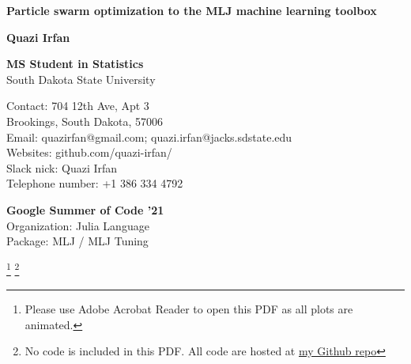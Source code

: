 \begin{titlepage}
    \begin{center}
        \vspace*{1cm}
        
        \Large
        \textbf{Particle swarm optimization to the MLJ machine learning toolbox}
        
        \vspace{0.25cm}
        
        \vspace{0.5cm}
        
        
        \vspace{1.5cm}
        
        \Large
        \textbf{Quazi Irfan\\}
        
        \vspace{0.5cm}
        \vspace{0.5cm}
        
        \small
        \begin{multicols}{2}
        \begin{flushleft}
        \textbf{MS Student in Statistics} \\
        South Dakota State University
        
        Contact: 704 12th Ave, Apt 3 \\
        Brookings, South Dakota, 57006 \\
        
        Email: quazirfan@gmail.com; quazi.irfan@jacks.sdstate.edu\\
        Websites: github.com/quazi-irfan/ \\
        Slack nick: Quazi Irfan \\
        Telephone number: +1 386 334 4792
        \end{flushleft}
        
        \vspace{0.8cm}
        
        \columnbreak
        \begin{flushleft}
        \textbf{Google Summer of Code '21} \\
        Organization: Julia Language \\
        Package: MLJ / MLJ Tuning 
        \end{flushleft}
        \end{multicols}
        \footnote{Please use Adobe Acrobat Reader to open this PDF as all plots are animated.}
        \footnote{No code is included in this PDF. All code are hosted at \href{https://github.com/quazi-irfan/Julia_PSO_GSoC21}{my Github repo}}
    \end{center}
\end{titlepage}